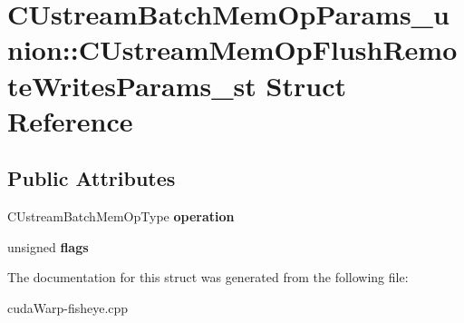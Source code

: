 \hypertarget{structCUstreamBatchMemOpParams__union_1_1CUstreamMemOpFlushRemoteWritesParams__st}{}\section{C\+Ustream\+Batch\+Mem\+Op\+Params\+\_\+union\+:\+:C\+Ustream\+Mem\+Op\+Flush\+Remote\+Writes\+Params\+\_\+st Struct Reference}
\label{structCUstreamBatchMemOpParams__union_1_1CUstreamMemOpFlushRemoteWritesParams__st}
\subsection*{Public Attributes}
\begin{DoxyCompactItemize}
\item 
C\+Ustream\+Batch\+Mem\+Op\+Type {\bfseries operation}\hypertarget{structCUstreamBatchMemOpParams__union_1_1CUstreamMemOpFlushRemoteWritesParams__st_ab48e10fdf7cb4b5ca551fc8cfc2866cb}{}\label{structCUstreamBatchMemOpParams__union_1_1CUstreamMemOpFlushRemoteWritesParams__st_ab48e10fdf7cb4b5ca551fc8cfc2866cb}

\item 
unsigned {\bfseries flags}\hypertarget{structCUstreamBatchMemOpParams__union_1_1CUstreamMemOpFlushRemoteWritesParams__st_ad90b68b18ce52e7b51142c05164afdf0}{}\label{structCUstreamBatchMemOpParams__union_1_1CUstreamMemOpFlushRemoteWritesParams__st_ad90b68b18ce52e7b51142c05164afdf0}

\end{DoxyCompactItemize}


The documentation for this struct was generated from the following file\+:\begin{DoxyCompactItemize}
\item 
cuda\+Warp-\/fisheye.\+cpp\end{DoxyCompactItemize}
